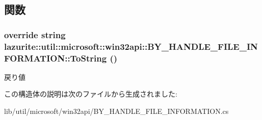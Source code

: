 \subsection{関数}
\hypertarget{structlazurite_1_1util_1_1microsoft_1_1win32api_1_1_b_y___h_a_n_d_l_e___f_i_l_e___i_n_f_o_r_m_a_t_i_o_n_a1c9720e30b1c2d05921eafbb909130ae}{
\subsubsection[{ToString}]{\setlength{\rightskip}{0pt plus 5cm}override string lazurite::util::microsoft::win32api::BY\_\-HANDLE\_\-FILE\_\-INFORMATION::ToString ()}}
\label{structlazurite_1_1util_1_1microsoft_1_1win32api_1_1_b_y___h_a_n_d_l_e___f_i_l_e___i_n_f_o_r_m_a_t_i_o_n_a1c9720e30b1c2d05921eafbb909130ae}
\begin{DoxyReturn}{戻り値}

\end{DoxyReturn}


この構造体の説明は次のファイルから生成されました:\begin{DoxyCompactItemize}
\item 
lib/util/microsoft/win32api/BY\_\-HANDLE\_\-FILE\_\-INFORMATION.cs\end{DoxyCompactItemize}
